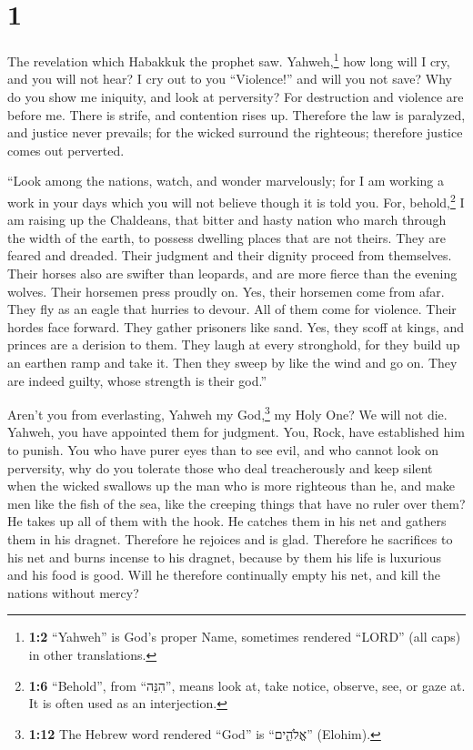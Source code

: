 \hypertarget{section}{%
\section{1}\label{section}}

 The revelation which Habakkuk the prophet saw.
 Yahweh,\footnote{\textbf{1:2} ``Yahweh'' is God's proper
  Name, sometimes rendered ``LORD'' (all caps) in other translations.}
how long will I cry, and you will not hear? I cry out to you
``Violence!'' and will you not save?  Why do you show me
iniquity, and look at perversity? For destruction and violence are
before me. There is strife, and contention rises up. 
Therefore the law is paralyzed, and justice never prevails; for the
wicked surround the righteous; therefore justice comes out perverted.

 ``Look among the nations, watch, and wonder marvelously;
for I am working a work in your days which you will not believe though
it is told you.  For, behold,\footnote{\textbf{1:6}
  ``Behold'', from ``הִנֵּה'', means look at, take notice, observe, see,
  or gaze at. It is often used as an interjection.} I am raising up the
Chaldeans, that bitter and hasty nation who march through the width of
the earth, to possess dwelling places that are not theirs.
 They are feared and dreaded. Their judgment and their
dignity proceed from themselves.  Their horses also are
swifter than leopards, and are more fierce than the evening wolves.
Their horsemen press proudly on. Yes, their horsemen come from afar.
They fly as an eagle that hurries to devour.  All of them
come for violence. Their hordes face forward. They gather prisoners like
sand.  Yes, they scoff at kings, and princes are a
derision to them. They laugh at every stronghold, for they build up an
earthen ramp and take it.  Then they sweep by like the
wind and go on. They are indeed guilty, whose strength is their god.''

 Aren't you from everlasting, Yahweh my God,\footnote{\textbf{1:12}
  The Hebrew word rendered ``God'' is ``אֱלֹהִ֑ים'' (Elohim).} my Holy
One? We will not die. Yahweh, you have appointed them for judgment. You,
Rock, have established him to punish.  You who have purer
eyes than to see evil, and who cannot look on perversity, why do you
tolerate those who deal treacherously and keep silent when the wicked
swallows up the man who is more righteous than he,  and
make men like the fish of the sea, like the creeping things that have no
ruler over them?  He takes up all of them with the hook.
He catches them in his net and gathers them in his dragnet. Therefore he
rejoices and is glad.  Therefore he sacrifices to his net
and burns incense to his dragnet, because by them his life is luxurious
and his food is good.  Will he therefore continually
empty his net, and kill the nations without mercy?

